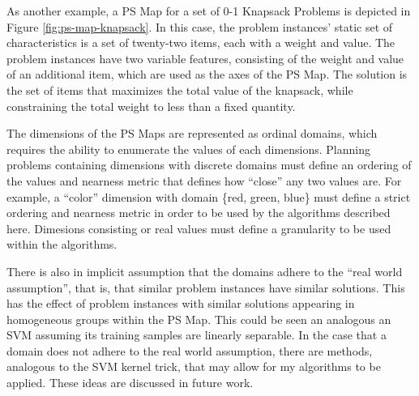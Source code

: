 As another example, a PS Map for a set of 0-1 Knapsack Problems is depicted in Figure \ref{fig:ps-map-knapsack}.  In this case, the problem instances' static set of characteristics is a set of twenty-two items, each with a weight and value.  The problem instances have two variable features, consisting of the weight and value of an additional item, which  are used as the axes of the PS Map.  The solution is the set of items that maximizes the total value of the knapsack, while constraining the total weight to less than a fixed quantity.

The dimensions of the PS Maps are represented as ordinal domains, which requires the ability to enumerate the values of each dimensions.  Planning problems containing dimensions with discrete domains must define an ordering of the values and nearness metric that defines how ``close'' any two values are.  For example, a ``color'' dimension with domain \{red, green, blue\} must define a strict ordering and nearness metric in order to be used by the algorithms described here.  Dimesions consisting or real values must define a granularity to be used within the algorithms.

There is also in implicit assumption that the domains adhere to the ``real world assumption'', that is, that similar problem instances have similar solutions.  This has the effect of problem instances with similar solutions appearing in homogeneous groups within the PS Map.  This could be seen an analogous an SVM assuming its training samples are linearly separable.  In the case that a domain does not adhere to the real world assumption, there are methods, analogous to the SVM kernel trick, that may allow for my algorithms to be applied.  These ideas are discussed in future work.
